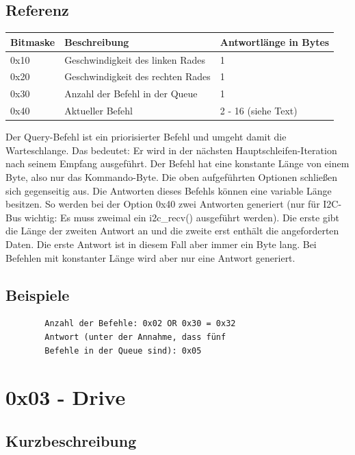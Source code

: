 \documentclass[a4paper]{article}
\begin{document}
	\subsection{Referenz}

	\begin{tabularx}{\linewidth}{|l|l|X|}
		\hline
		\textbf{Bitmaske} & \textbf{Beschreibung} & \textbf{Antwortlänge in Bytes} \\
		\hline
		\hline
		0x10 				& Geschwindigkeit des linken Rades & 1 \\
		\hline
		0x20				& Geschwindigkeit des rechten Rades & 1 \\
		\hline
		0x30				& Anzahl der Befehl in der Queue & 1 \\
		\hline
		0x40				& Aktueller Befehl & 2 - 16 (siehe Text) \\
		\hline
	\end{tabularx}

	Der Query-Befehl ist ein priorisierter Befehl und umgeht damit die
	Warteschlange. Das bedeutet: Er wird in der nächsten
	Hauptschleifen-Iteration nach seinem Empfang ausgeführt. Der Befehl
	hat eine konstante Länge von einem Byte, also nur das Kommando-Byte.
	Die oben aufgeführten Optionen schließen sich gegenseitig aus.
	Die Antworten dieses Befehls können eine variable Länge besitzen.
	So werden bei der Option 0x40 zwei Antworten generiert (nur für I2C-Bus
	wichtig: Es muss zweimal ein i2c\_recv() ausgeführt werden). Die erste
	gibt die Länge der zweiten Antwort an und die zweite erst enthält die
	angeforderten Daten. Die erste Antwort ist in diesem Fall aber immer
	ein Byte lang. Bei Befehlen mit konstanter Länge wird aber nur
	eine Antwort generiert.

	\subsection{Beispiele}

	\begin{verbatim}	
		Anzahl der Befehle: 0x02 OR 0x30 = 0x32
		Antwort (unter der Annahme, dass fünf
		Befehle in der Queue sind): 0x05
	\end{verbatim}
	\pagebreak


	\section{0x03 - Drive}

	\subsection{Kurzbeschreibung}
	
\end{document}
